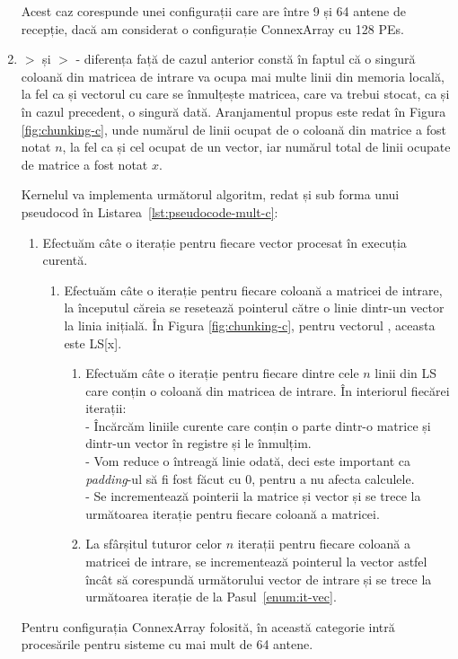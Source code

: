 \begin{enumerate}[label=\alph*., ref=\alph*]
  Acest caz corespunde unei configurații care are între 9 și 64 antene de
  recepție, dacă am considerat o configurație ConnexArray cu 128 PEs.

  \item \label{enum:kernel-c}  $>$  și
   $>$  - diferența față de cazul
  anterior constă în faptul că o singură coloană din matricea de intrare va
  ocupa mai multe linii din memoria locală, la fel ca și vectorul cu care se
  înmulțește matricea, care va trebui stocat, ca și în cazul precedent, o
  singură dată. Aranjamentul propus este redat în Figura
  \ref{fig:chunking-c}, unde numărul de linii ocupat de o coloană din matrice a
  fost notat $n$, la fel ca și cel ocupat de un vector, iar numărul total de
  linii ocupate de matrice a fost notat $x$.

  Kernelul va implementa următorul algoritm, redat și sub forma unui pseudocod
  în Listarea~\ref{lst:pseudocode-mult-c}:
  \begin{enumerate}[label=\arabic*., ref=\arabic*]
    \item \label{enum:it-vec} Efectuăm câte o iterație pentru fiecare vector
    procesat în execuția curentă.
    \begin{enumerate}[label*=\arabic*., ref=\arabic*]
      \item Efectuăm câte o iterație pentru fiecare coloană a matricei de intrare,
      la începutul căreia se resetează pointerul către o linie dintr-un vector la
      linia inițială. În Figura \ref{fig:chunking-c}, pentru vectorul ,
      aceasta este LS[x].
      \begin{enumerate}[label*=\arabic*., ref=\arabic*]
        \item Efectuăm câte o iterație pentru fiecare dintre cele $n$ linii din LS
        care conțin o coloană din matricea de intrare. În interiorul fiecărei
        iterații:\\
          - Încărcăm liniile curente care conțin o parte
          dintr-o matrice și dintr-un vector în registre și le înmulțim.\\
          - Vom reduce o întreagă linie odată, deci este important ca
          \textit{padding}-ul să fi fost făcut cu 0, pentru a nu afecta
          calculele.\\
          - Se incrementează pointerii la matrice și vector și se trece la
          următoarea iterație pentru fiecare coloană a matricei.
        \item La sfârșitul tuturor celor $n$ iterații pentru fiecare coloană a
        matricei de intrare, se incrementează pointerul la vector astfel încât să
        corespundă următorului vector de intrare și se trece la următoarea iterație
        de la Pasul~\ref{enum:it-vec}.
      \end{enumerate}
    \end{enumerate}
  \end{enumerate}
  
  Pentru configurația ConnexArray folosită, în această categorie intră
  procesările pentru sisteme cu mai mult de 64 antene.
\end{enumerate}

